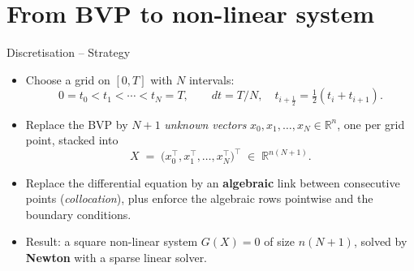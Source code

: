 \documentclass[11pt,aspectratio=169]{beamer}
\begin{document}
\section{From BVP to non-linear system}

\begin{frame}{Discretisation -- Strategy}

\begin{itemize}

\item Choose a grid on $[0,T]$ with $N$ intervals:
  \[
  0 = t_0 < t_1 < \cdots < t_N = T,
  \qquad
  dt = T/N,
  \quad
  t_{i+\frac12} = \tfrac12(t_i+t_{i+1}).
  \]

\item Replace the BVP by $N{+}1$ \emph{unknown vectors} $x_0,x_1,\ldots,x_N \in \mathbb R^n$,
  one per grid point, stacked into
  \[
  X \;=\; \bigl(x_0^\top, x_1^\top, \ldots, x_N^\top\bigr)^\top
  \;\in\; \mathbb R^{n(N+1)}.
  \]

\item Replace the differential equation by an \textbf{algebraic} link
  between consecutive points (\emph{collocation}), plus enforce the
  algebraic rows pointwise and the boundary conditions.\newline

\item Result: a square non-linear system $G(X)=0$ of size
  $n(N{+}1)$, solved by \textbf{Newton} with a sparse linear solver.

\end{itemize}

\end{frame}
\end{document}
